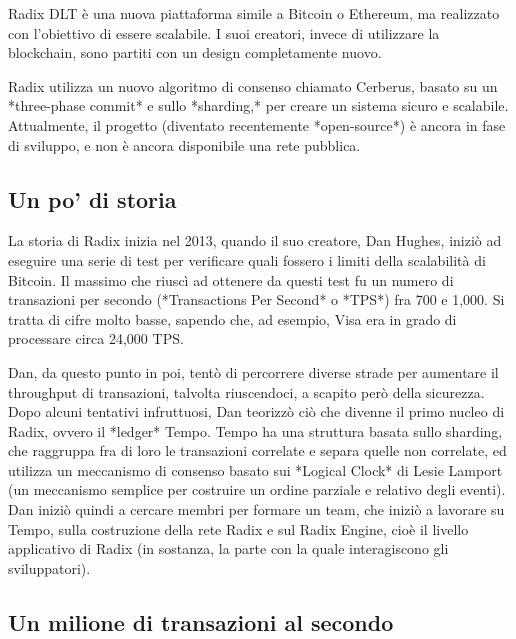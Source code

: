 Radix DLT è una nuova piattaforma simile a Bitcoin o Ethereum, ma realizzato con l'obiettivo di essere scalabile. I suoi creatori, invece di utilizzare la blockchain, sono partiti con un design completamente nuovo.

Radix utilizza un nuovo algoritmo di consenso chiamato Cerberus, basato su un *three-phase commit* e sullo *sharding,* per creare un sistema sicuro e scalabile. Attualmente, il progetto (diventato recentemente *open-source*) è ancora in fase di sviluppo, e non è ancora disponibile una rete pubblica.

\subsection{Un po' di storia}

La storia di Radix inizia nel 2013, quando il suo creatore, Dan Hughes, iniziò ad eseguire una serie di test per verificare quali fossero i limiti della scalabilità di Bitcoin. Il massimo che riuscì ad ottenere da questi test fu un numero di transazioni per secondo (*Transactions Per Second* o *TPS*) fra 700 e 1,000. Si tratta di cifre molto basse, sapendo che, ad esempio, Visa era in grado di processare circa 24,000 TPS. 

Dan, da questo punto in poi, tentò di percorrere diverse strade per aumentare il throughput di transazioni, talvolta riuscendoci, a scapito però della sicurezza. Dopo alcuni tentativi infruttuosi, Dan teorizzò ciò che divenne il primo nucleo di Radix, ovvero il *ledger* Tempo. Tempo ha una struttura basata sullo sharding, che raggruppa fra di loro le transazioni correlate e separa quelle non correlate, ed utilizza un meccanismo di consenso basato sui *Logical Clock* di Lesie Lamport (un meccanismo semplice per costruire un ordine parziale e relativo degli eventi). Dan iniziò quindi a cercare membri per formare un team, che iniziò a lavorare su Tempo, sulla costruzione della rete Radix e sul Radix Engine, cioè il livello applicativo di Radix (in sostanza, la parte con la quale interagiscono gli sviluppatori). 

\subsection{Un milione di transazioni al secondo}

